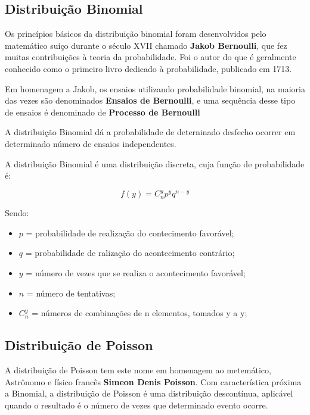 \subsection{Distribuição Binomial}

Os princípios básicos da distribuição binomial foram desenvolvidos pelo matemático suíço durante o século XVII chamado \textbf{Jakob Bernoulli}, que fez muitas contribuições à teoria da probabilidade. Foi o autor do que é geralmente conhecido como o primeiro livro dedicado à probabilidade, publicado em 1713.\vskip0.3cm

Em homenagem a Jakob, os ensaios utilizando probabilidade binomial, na maioria das vezes são denominados \textbf{Ensaios de Bernoulli}, e uma sequência desse tipo de ensaios é denominado de \textbf{Processo de Bernoulli} \vskip0.3cm


A distribuição Binomial dá a probabilidade de deterninado desfecho ocorrer em determinado número de ensaios independentes. \vskip0.3cm


\inic A distribuição Binomial é uma distribuição discreta, cuja função de probabilidade é:
 
\begin{equation}
f(y) = C_{n}^{y}p^{y}q^{n-y}
\end{equation}
 
Sendo: \vskip0.3cm

\begin{itemize}
\item $p$ = probabilidade de realização do contecimento favorável; 
\item  $q$ = probabilidade de ralização do acontecimento contrário;  
\item $y$ = número de vezes que se realiza o acontecimento favorável;  
\item $n$ = número de tentativas; 
\item $C_{n}^{y}$ = números de combinações de n elementos, tomados y a y; 
\end{itemize} 




 
\newpage
\subsection{Distribuição de Poisson}

A distribuição de Poisson tem este nome em homenagem ao metemático, Astrônomo e físico francês \textbf{Simeon Denis Poisson}. Com característica próxima a Binomial, a distribuição de Poisson é uma distribuição descontínua, aplicável quando o resultado é o número de vezes que determinado evento ocorre. \vskip0.3cm

